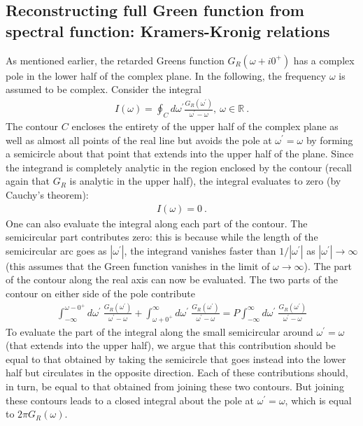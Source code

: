\subsection{Reconstructing full Green function from spectral function: Kramers-Kronig relations}
As mentioned earlier, the retarded Greens function \(G_R(\omega + i 0^+)\) has a complex pole in the lower half of the complex plane. In the following, the frequency \(\omega\) is assumed to be complex. Consider the integral
\begin{equation}\begin{aligned}
	I(\omega) = \oint_C d\omega^\prime \frac{G_R(\omega^\prime)}{\omega^\prime - \omega},~\omega \in \mathbb{R}~.
\end{aligned}\end{equation}
The contour \(C\) encloses the entirety of the upper half of the complex plane as well as almost all points of the real line but avoids the pole at \(\omega^\prime = \omega\) by forming a semicircle about that point that extends into the upper half of the plane. Since the integrand is completely analytic in the region enclosed by the contour (recall again that \(G_R\) is analytic in the upper half), the integral evaluates to zero (by Cauchy's theorem):
\begin{equation}\begin{aligned}\label{zerointegral}
	I(\omega) = 0~.
\end{aligned}\end{equation}
One can also evaluate the integral along each part of the contour. The semicircular part contributes zero: this is because while the length of the semicircular arc goes as \(|\omega^\prime|\), the integrand vanishes faster than \(1/|\omega^\prime|\) as \(|\omega^\prime| \to \infty\) (this assumes that the Green function vanishes in the limit of \(\omega \to \infty\)). The part of the contour along the real axis can now be evaluated. The two parts of the contour on either side of the pole contribute
\begin{equation}\begin{aligned}
	\int_{-\infty}^{\omega - 0^+}d\omega^\prime~\frac{G_R(\omega^\prime)}{\omega^\prime - \omega} + \int_{\omega + 0^+}^{\infty}d\omega^\prime~\frac{G_R(\omega^\prime)}{\omega^\prime - \omega} = P\int_{-\infty}^{\infty}d\omega^\prime~\frac{G_R(\omega^\prime)}{\omega^\prime - \omega}
\end{aligned}\end{equation}
To evaluate the part of the integral along the small semicircular around \(\omega^\prime = \omega\) (that extends into the upper half), we argue that this contribution should be equal to that obtained by taking the semicircle that goes instead into the lower half but circulates in the opposite direction. Each of these contributions should, in turn, be equal to that obtained from joining these two contours. But joining these contours leads to a closed integral about the pole at \(\omega^\prime = \omega\), which is equal to \(2\pi G_R(\omega)\).
